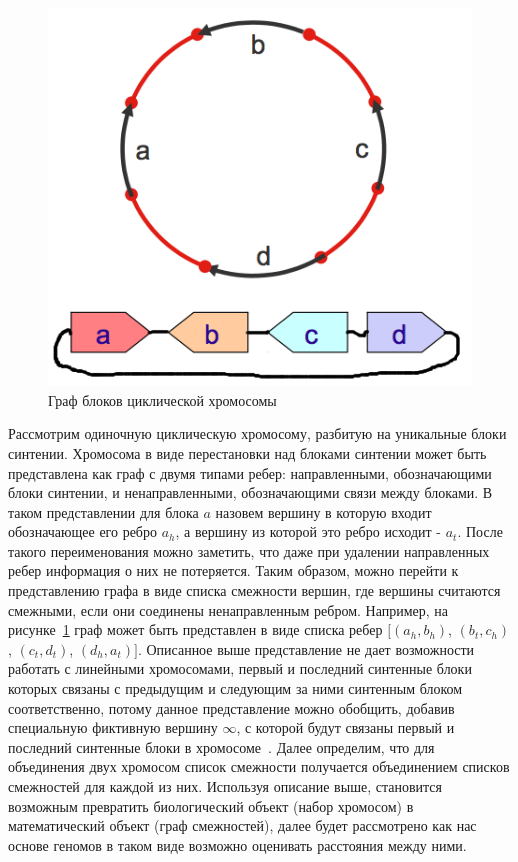 \begin{figure}[H]
  \centering
  \includegraphics[max width=0.5\linewidth]{fig/1/block_graph.png}
  \caption{Граф блоков циклической хромосомы}
  \label{fig:block_graph}
\end{figure}
Рассмотрим одиночную циклическую хромосому, разбитую на уникальные блоки синтении.
Хромосома в виде перестановки над блоками синтении может быть представлена как граф с двумя типами ребер:
направленными, обозначающими блоки синтении, и ненаправленными, обозначающими связи между блоками.
В таком представлении для блока $a$ назовем вершину в которую входит обозначающее его ребро $a_h$, а вершину из которой это ребро исходит - $a_t$.
После такого переименования можно заметить, что даже при удалении направленных ребер информация о них не потеряется.
Таким образом, можно перейти к представлению графа в виде списка смежности вершин,
где вершины считаются смежными, если они соединены ненаправленным ребром.
Например, на рисунке~\ref{fig:block_graph} граф может быть представлен в виде списка ребер $[(a_h, b_h)$, $(b_t, c_h)$, $(c_t, d_t)$, $(d_h, a_t)]$.
Описанное выше представление не дает возможности работать с линейными хромосомами,
первый и последний синтенные блоки которых связаны с предыдущим и следующим за ними синтенным блоком соответственно, потому
данное представление можно обобщить, добавив специальную фиктивную вершину $\infty$,
с которой будут связаны первый и последний синтенные блоки в хромосоме~\cite{Alekseyev2009}.
Далее определим, что для объединения двух хромосом список смежности получается объединением списков смежностей для каждой из них.
Используя описание выше, становится возможным превратить биологический объект (набор хромосом) в математический объект (граф смежностей),
далее будет рассмотрено как нас основе геномов в таком виде возможно оценивать расстояния между ними.

